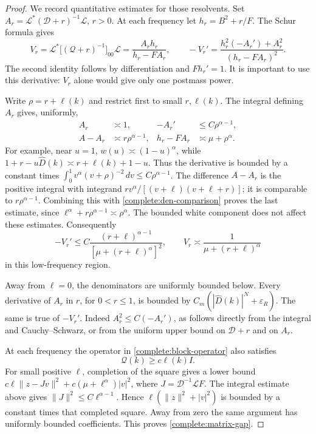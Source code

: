 \documentclass[11pt]{article}
\begin{document}
\begin{proof}
We record quantitative estimates for those resolvents. Set
\(A_r=\mathcal L^*(\mathscr D+r)^{-1}\mathcal L\), \(r>0\).
At each frequency let \(h_r=B^2+r/F\). The Schur formula gives
\begin{equation}\label{complete:resolvent-compression}
 V_r=\mathcal L^*\bigl[(\mathcal Q+r)^{-1}\bigr]_{00}\mathcal L
       =\frac{A_rh_r}{h_r-F A_r},\qquad
 -V_r'=\frac{h_r^2(-A_r')+A_r^2}{(h_r-F A_r)^2}.
\end{equation}
The second identity follows by differentiation and \(Fh_r'=1\).
It is important to use this derivative: \(V_r\) alone would give
only one postmass power.

Write \(\rho=r+\ell(k)\) and restrict first to small \(r,\ell(k)\).
The integral defining \(A_r\) gives, uniformly,
\begin{align}
 A_r&\asymp1, &
 -A_r'&\le C\rho^{\alpha-1},\nonumber\\
 A-A_r&\asymp r\rho^{\alpha-1}, &
 h_r-F A_r&\asymp\mu+\rho^\alpha.
 \label{complete:resolvent-estimates}
\end{align}
For example, near \(u=1\), \(w(u)\asymp(1-u)^\alpha\), while
\(1+r-u\widehat D(k)\asymp r+\ell(k)+1-u\).
Thus the derivative is bounded by a constant times
\(\int_0^1v^\alpha(v+\rho)^{-2}\,dv\le C\rho^{\alpha-1}\).
The difference \(A-A_r\) is the positive integral with integrand
\(r v^\alpha/[(v+\ell)(v+\ell+r)]\); it is comparable to
\(r\rho^{\alpha-1}\). Combining this with
\eqref{complete:den-comparison} proves the last estimate, since
\(\ell^\alpha+r\rho^{\alpha-1}\asymp\rho^\alpha\).
The bounded white component does not affect these estimates.
Consequently
\begin{equation}\label{complete:V-derivative}
 -V_r'\le C\frac{(r+\ell)^{\alpha-1}}
                         {[\mu+(r+\ell)^\alpha]^2},
 \qquad V_r\asymp\frac1{\mu+(r+\ell)^\alpha}
\end{equation}
in this low-frequency region.

Away from \(\ell=0\), the denominators are uniformly bounded below.
Every derivative of \(A_r\) in \(r\), for \(0<r\le1\), is bounded
by \(C_m(|\widehat D(k)|^N+\varepsilon_R)\). The same is true
of \(-V_r'\). Indeed \(A_r^2\le C(-A_r')\), as follows directly
from the integral and Cauchy--Schwarz, or from the uniform upper
bound on \(\mathscr D+r\) and on \(A_r\).

At each frequency the operator in \eqref{complete:block-operator}
also satisfies
\begin{equation}\label{complete:matrix-gap}
 \mathcal Q(k)\ge c\ell(k)I.
\end{equation}
For small positive \(\ell\), completion of the square gives a lower
bound
\(c\ell\|z-Jv\|^2+c(\mu+\ell^\alpha)|v|^2\), where
\(J=\mathscr D^{-1}\mathcal L F\).
The integral estimate above gives \(\|J\|^2\le C\ell^{\alpha-1}\).
Hence \(\ell(\|z\|^2+|v|^2)\) is bounded by a constant times that
completed square. Away from zero the same argument has uniformly
bounded coefficients. This proves \eqref{complete:matrix-gap}.


\end{proof}
\end{document}
